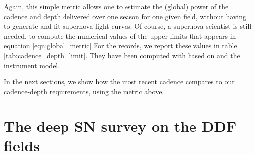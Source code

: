 \documentclass[\docopts]{\docclass}
\begin{document}
\begin{table}[t]
\begin{center}
\begin{tabular}{l|c|rrrrr}
\hline
\end{tabular}
\end{center}
\end{table}

Again, this simple metric allows one to estimate the (global) power of
the cadence and depth delivered over one season for one given field,
without having to generate and fit supernova light curves.  Of course,
a supernova scientist is still needed, to compute the numerical values
of the upper limits that appears in equation \ref{eqn:global_metric}
For the records, we report these values in table
\ref{tab:cadence_depth_limit}. They have been computed with
 based on  and the 
instrument model.

In the next sections, we show how the most recent 
cadence compares to our cadence-depth requirements, using the metric
above.  



\section{The deep SN survey on the DDF fields}
\label{sec:ddf_cadence}
\end{document}
